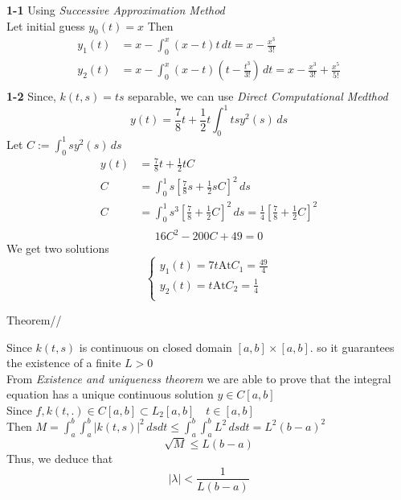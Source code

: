 \documentclass[]{article}
\begin{document}
\textbf{1-1}
Using \textit{Successive Approximation Method}\\
Let initial guess $y_0(t) =x$ Then
\begin{align*}
    y_1(t) & = x -\int_0^x (x-t)t \, dt = x-\frac{x^3}{3!}                                \\
    y_2(t) & = x -\int_0^x (x-t)(t-\frac{t^3}{3!})\, dt = x-\frac{x^3}{3!}+\frac{x^5}{5!} \\
\end{align*}
\textbf{1-2}
Since, $k(t,s)=ts$ separable, we can use \textit{Direct Computational Medthod}\\
\begin{equation*}
    y(t) = \frac{7}{8}t + \frac{1}{2}t \int_0^1 ts y^2(s) \, ds
\end{equation*}
Let $C:=\int_0^1 s y^2(s) \, ds$
\begin{align*}
    y(t) & = \frac{7}{8}t + \frac{1}{2}tC                                                                                       \\
    C    & = \int_0^1 s \left[\frac{7}{8}s + \frac{1}{2}sC\right]^2 \,ds                                                        \\
    C    & = \int_0^1 s^3 \left[\frac{7}{8} + \frac{1}{2}C\right]^2 \,ds = \frac{1}{4}\left[\frac{7}{8} + \frac{1}{2}C\right]^2 \\
\end{align*}
\begin{equation*}
    16C^2 -200C+49=0
\end{equation*}
We get two solutions
\[
    \begin{cases}
        y_1(t) = 7t \text{At} C_1 = \frac{49}{4} \\
        y_2(t) = t \text{At} C_2 = \frac{1}{4}   \\
    \end{cases}
\]

Theorem//

Since $k(t,s)$ is continuous on closed domain $[a,b]\times[a,b]$. so it guarantees the existence of a finite  $L>0$\\
From \textit{Existence and uniqueness theorem} we are able to prove that the integral equation has a unique continuous solution $y\in C[a,b]$\\
Since $f,k(t,.) \in C[a,b] \subset L_2[a,b] \quad t \in [a,b]$\\
Then $M = \int_a^b \int_a^b |k(t,s)|^2 \, ds dt \leq \int_a^b \int_a^b L^2 \, ds dt = L^2 (b-a)^2 $\\
$$\sqrt{M} \leq L(b-a)$$
Thus, we deduce that
$$|\lambda| < \frac{1}{L(b-a)}$$

\end{document}
